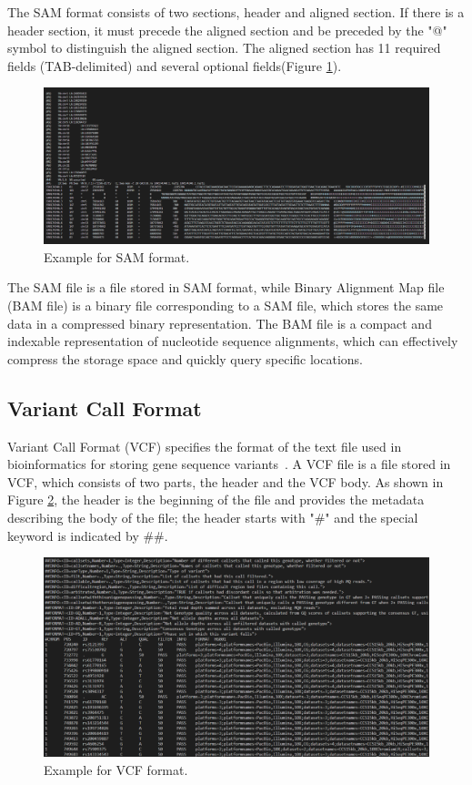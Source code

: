 \documentclass[PhD]{PHlab-thesis}
\begin{document}
The SAM format consists of two sections, header and aligned section. If there is a header section, it must precede the aligned section and be preceded by the "@" symbol to distinguish the aligned section. The aligned section has 11 required fields (TAB-delimited) and several optional fields(Figure \ref{fig:SAM format}).

\begin{figure}[h!]
	\centering
	\includegraphics[scale=0.3]{figures/Example for SAM file.png}
	\caption{Example for SAM format.}
	\label{fig:SAM format} %
\end{figure}

The SAM file is a file stored in SAM format, while Binary Alignment Map file (BAM file) is a binary file corresponding to a SAM file, which stores the same data in a compressed binary representation. The BAM file is a compact and indexable representation of nucleotide sequence alignments, which can effectively compress the storage space and quickly query specific locations.

\subsection{Variant Call Format}
Variant Call Format (VCF) specifies the format of the text file used in bioinformatics for storing gene sequence variants~\cite{Danecek2011VCF}. A VCF file is a file stored in VCF, which consists of two parts, the header and the VCF body. As shown in Figure \ref{fig:VCF format}, the header is the beginning of the file and provides the metadata describing the body of the file; the header starts with "\#" and the special keyword is indicated by \#\#.

\begin{figure}[h!]
	\centering
	\includegraphics[scale=0.3]{figures/Example for VCF file.png}
	\caption{Example for VCF format.}
	\label{fig:VCF format} %
\end{figure}
\end{document}
